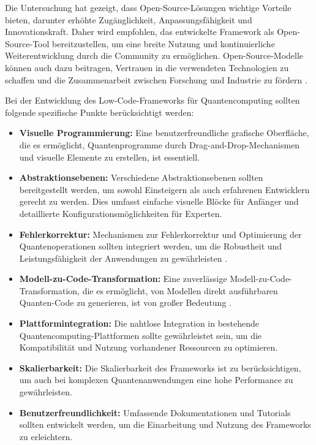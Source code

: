 Die Untersuchung hat gezeigt, dass Open-Source-Lösungen wichtige Vorteile bieten, darunter erhöhte Zugänglichkeit, 
Anpassungsfähigkeit und Innovationskraft. Daher wird empfohlen, das entwickelte Framework als Open-Source-Tool bereitzustellen, 
um eine breite Nutzung und kontinuierliche Weiterentwicklung durch die Community zu ermöglichen. Open-Source-Modelle können 
auch dazu beitragen, Vertrauen in die verwendeten Technologien zu schaffen und die Zusammenarbeit zwischen Forschung und 
Industrie zu fördern \cite{Cabot_2020}.

Bei der Entwicklung des Low-Code-Frameworks für Quantencomputing sollten folgende spezifische Punkte berücksichtigt werden:

\begin{itemize}
    \item \textbf{Visuelle Programmierung:} Eine benutzerfreundliche grafische Oberfläche, die es ermöglicht, Quantenprogramme 
    durch Drag-and-Drop-Mechanismen und visuelle Elemente zu erstellen, ist essentiell.
    \item \textbf{Abstraktionsebenen:} Verschiedene Abstraktionsebenen sollten bereitgestellt werden, um sowohl Einsteigern 
    als auch erfahrenen Entwicklern gerecht zu werden. Dies umfasst einfache visuelle Blöcke für Anfänger und detaillierte Konfigurationsmöglichkeiten für Experten.
    \item \textbf{Fehlerkorrektur:} Mechanismen zur Fehlerkorrektur und Optimierung der Quantenoperationen sollten integriert 
    werden, um die Robustheit und Leistungsfähigkeit der Anwendungen zu gewährleisten \cite{Weder_2020}.
    \item \textbf{Modell-zu-Code-Transformation:} Eine zuverlässige Modell-zu-Code-Transformation, die es ermöglicht, von Modellen 
    direkt ausführbaren Quanten-Code zu generieren, ist von großer Bedeutung \cite{France_2007}.
    \item \textbf{Plattformintegration:} Die nahtlose Integration in bestehende Quantencomputing-Plattformen sollte gewährleistet 
    sein, um die Kompatibilität und Nutzung vorhandener Ressourcen zu optimieren.
    \item \textbf{Skalierbarkeit:} Die Skalierbarkeit des Frameworks ist zu berücksichtigen, um auch bei komplexen Quantenanwendungen 
    eine hohe Performance zu gewährleisten.
    \item \textbf{Benutzerfreundlichkeit:} Umfassende Dokumentationen und Tutorials sollten entwickelt werden, um die Einarbeitung und 
    Nutzung des Frameworks zu erleichtern.

\end{itemize}
